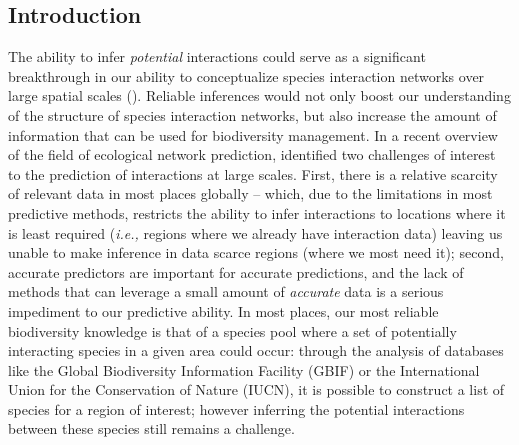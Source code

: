 \begin{refsection}

\section{Introduction}

The ability to infer \emph{potential} interactions could serve as a
significant breakthrough in our ability to conceptualize species
interaction networks over large spatial scales (\cite{Hortal2015Seven}).
Reliable inferences would not only boost our understanding of the
structure of species interaction networks, but also increase the amount
of information that can be used for biodiversity management. In a recent
overview of the field of ecological network prediction,
\cite{Strydom2021Roadmap} identified two challenges of interest to the
prediction of interactions at large scales. First, there is a relative
scarcity of relevant data in most places globally -- which, due to the
limitations in most predictive methods, restricts the ability to infer
interactions to locations where it is least required (\emph{i.e.,}
regions where we already have interaction data) leaving us unable to
make inference in data scarce regions (where we most need it); second,
accurate predictors are important for accurate predictions, and the lack
of methods that can leverage a small amount of \emph{accurate} data is a
serious impediment to our predictive ability. In most places, our most
reliable biodiversity knowledge is that of a species pool where a set of
potentially interacting species in a given area could occur: through the
analysis of databases like the Global Biodiversity Information Facility
(GBIF) or the International Union for the Conservation of Nature (IUCN),
it is possible to construct a list of species for a region of interest;
however inferring the potential interactions between these species still
remains a challenge.


\end{refsection}
